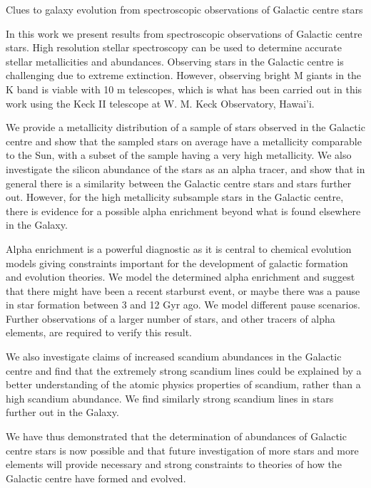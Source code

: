 Clues to galaxy evolution from spectroscopic observations of Galactic centre stars

In this work we present results from spectroscopic observations of Galactic centre stars. High resolution stellar spectroscopy can be used to determine accurate stellar metallicities and abundances. Observing stars in the Galactic centre is challenging due to extreme extinction. However, observing bright M giants in the K band is viable with 10 m telescopes, which is what has been carried out in this work using the Keck II telescope at W. M. Keck Observatory, Hawai'i.

We provide a metallicity distribution of a sample of stars observed in the Galactic centre and show that the sampled stars on average have a metallicity comparable to the Sun, with a subset of the sample having a very high metallicity. We also investigate the silicon abundance of the stars as an alpha tracer, and show that in general there is a similarity between the Galactic centre stars and stars further out. However, for the high metallicity subsample stars in the Galactic centre, there is evidence for a possible alpha enrichment beyond what is found elsewhere in the Galaxy.

Alpha enrichment is a powerful diagnostic as it is central to chemical evolution models giving constraints important for the development of galactic formation and evolution theories. We model the determined alpha enrichment and suggest that there might have been a recent starburst event, or maybe there was a pause in star formation between 3 and 12 Gyr ago. We model different pause scenarios. Further observations of a larger number of stars, and other tracers of alpha elements, are required to verify this result.

We also investigate claims of increased scandium abundances in the Galactic centre and find that the extremely strong scandium lines could be explained by a better understanding of the atomic physics properties of scandium, rather than a high scandium abundance. We find similarly strong scandium lines in stars further out in the Galaxy.

We have thus demonstrated that the determination of abundances of Galactic centre stars is now possible and that future investigation of more stars and more elements will provide necessary and strong constraints to theories of how the Galactic centre have formed and evolved.
